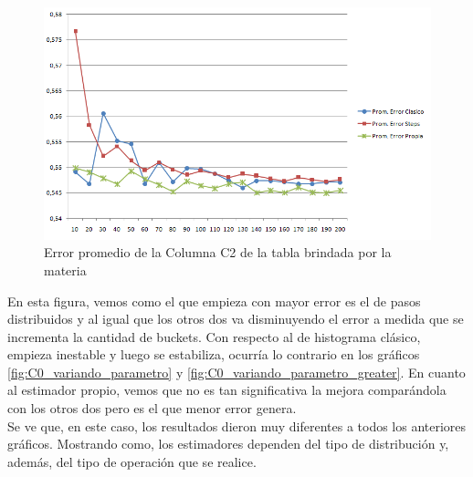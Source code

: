 \begin{itemize}
\begin{figure}[H]
	  \begin{center}
	    \includegraphics[scale=.80]{imagenes/parametroVariableC2Greater.png}
	    \caption{Error promedio de la Columna C2 de la tabla brindada por la materia} 
	    \label{fig:C2_variando_paremetro_greater}
	  \end{center}
\end{figure}

\quad En esta figura, vemos como el que empieza con mayor error es el de pasos distribuidos y al igual que los otros dos va disminuyendo el error a medida que se incrementa la cantidad de buckets. Con respecto al de histograma cl\'asico, empieza inestable y luego se estabiliza, ocurr\'ia lo contrario en los gr\'aficos \ref{fig:C0_variando_parametro} y \ref{fig:C0_variando_parametro_greater}. En cuanto al estimador propio, vemos que no es tan significativa la mejora compar\'andola con los otros dos pero es el que menor error genera. \\

\quad Se ve que, en este caso, los resultados dieron muy diferentes a todos los anteriores gr\'aficos. Mostrando como, los estimadores dependen del tipo de distribuci\'on y, adem\'as, del tipo de operaci\'on que se realice. \\

\end{itemize}